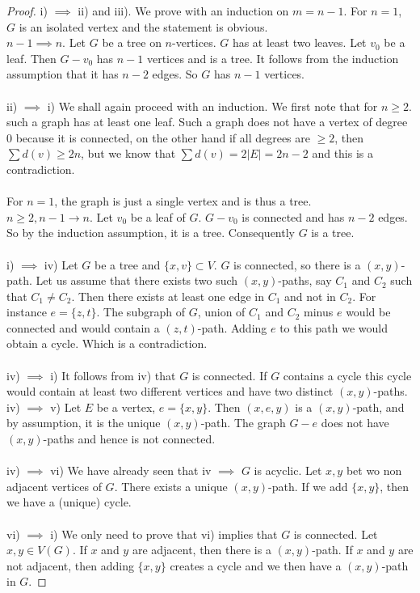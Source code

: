 \documentclass[12pt,a4paper]{article}
\theoremstyle{definition}
\begin{document}
\begin{proof}
i) $\implies$ ii) and iii). We prove with an induction on $m=n-1$. For $n=1$, $G$ is an isolated vertex and the statement is obvious. 
\\
$n-1 \implies n$. Let $G$ be a tree on $n$-vertices. $G$ has at least two leaves. Let $v_0$ be a leaf. Then $G-v_0$ has $n-1$ vertices and is a tree. It follows from the induction assumption that it has $n-2$ edges. So $G$ has $n-1$ vertices.\\
\\
ii) $\implies$ i) We shall again proceed with an induction. We first note that for $n \geq 2$. such a graph has at least one leaf. Such a graph does not have a vertex of degree $0$ because it is connected, on the other hand if all degrees are $\geq 2$, then $\sum d(v) \geq 2n$, but we know that $\sum d(v) = 2|E|=2n-2$ and this is a contradiction. 
\\\\
For $n=1$, the graph is just a single vertex and is thus a tree. \\
$n \geq 2, n-1 \to n$. Let $v_0$ be a leaf of $G$. $G-v_0$ is connected and has $n-2$ edges. So by the induction assumption, it is a tree. Consequently $G$ is a tree. \\
\\
i) $\implies$ iv) Let $G$ be a tree and $\{x,v\} \subset V$. $G$ is connected, so there is a $(x,y)$-path. Let us assume that there exists two such $(x,y)$-paths, say $C_1$ and $C_2$ such that $C_1 \neq C_2$. Then there exists at least one edge in $C_1$ and not in $C_2$. For instance $e=\{z,t\}.$ The subgraph of $G$, union of $C_1$ and $C_2$ minus $e$ would be connected and would contain a $(z,t)$-path. Adding $e$ to this path we would obtain a cycle. Which is a contradiction.
\\\\
iv) $\implies$ i) It follows from iv) that $G$ is connected. If $G$ contains a cycle this cycle would contain at least two different vertices and have two distinct $(x,y)$-paths. 
\newpage
iv) $\implies$ v) Let $E$ be a vertex, $e=\{x,y\}.$ Then $(x,e,y)$ is a $(x,y)$-path, and by  assumption, it is the unique $(x,y)$-path. The graph $G-e$ does not have $(x,y)$-paths and hence is not connected. 
\\\\
iv) $\implies$ vi) We have already seen that  iv $\implies$ $G$ is acyclic. Let $x,y$ bet wo non adjacent vertices of $G$. There exists a unique $(x,y)$-path. If we add $\{x,y\}$, then we have a (unique) cycle. \\
\\
vi) $\implies$ i) We only need to prove that vi) implies that $G$ is connected. Let $x,y \in V(G)$. If $x$ and $y$ are adjacent,  then there is a $(x ,y)$-path. If $x$ and $y$ are not adjacent, then adding $\{x,y\}$ creates a cycle and we then have a $(x, y)$-path in $G$. 
\end{proof}
\end{document}
